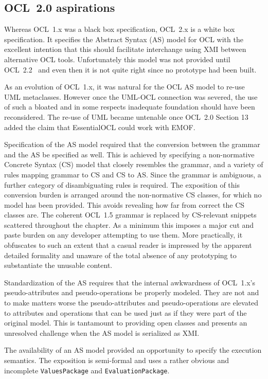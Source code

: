 \documentclass{jot}
\begin{document}
\subsection{OCL~2.0 aspirations}\label{OCL~2.0 aspirations}

Whereas OCL~1.x was a black box specification, OCL~2.x is a white box specification. It specifies the Abstract Syntax (AS) model for OCL with the excellent intention that this should facilitate interchange using XMI between alternative OCL tools. Unfortunately this model was not provided until OCL~2.2~\cite{OCL-2.2} and even then it is not quite right since no prototype had been built.

As an evolution of OCL~1.x, it was natural for the OCL AS model to re-use UML metaclasses. However once the UML-OCL connection was severed, the use of such a bloated and in some respects inadequate foundation should have been reconsidered. The re-use of UML became untenable once OCL~2.0 Section 13 added the claim that EssentialOCL could work with EMOF.

Specification of the AS model required that the conversion between the grammar and the AS be specified as well. This is achieved by specifying a non-normative Concrete Syntax (CS) model that closely resembles the grammar, and a variety of rules mapping grammar to CS and CS to AS. Since the grammar is ambiguous, a further category of disambiguating rules is required. The exposition of this conversion burden is arranged around the non-normative CS classes, for which no model has been provided. This avoids revealing how far from correct the CS classes are. The coherent OCL~1.5 grammar is replaced by CS-relevant snippets scattered throughout the chapter. As a minimum this imposes a major cut and paste burden on any developer attempting to use them. More practically, it obfuscates to such an extent that a casual reader is impressed by the apparent detailed formality and unaware of the total absence of any prototyping to substantiate the unusable content.

Standardization of the AS requires that the internal awkwardness of OCL~1.x's pseudo-attributes and pseudo-operations be properly modeled. They are not and to make matters worse the pseudo-attributes and pseudo-operations are elevated to attributes and operations that can be used just as if they were part of the original model. This is tantamount to providing open classes and presents an unresolved challenge when the AS model is serialized as XMI.

The availability of an AS model provided an opportunity to specify the execution semantics. The exposition is semi-formal and uses a rather obvious and incomplete \verb$ValuesPackage$ and \verb$EvaluationPackage$. %
\end{document}
